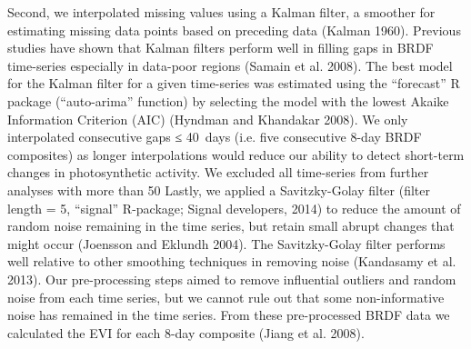 Second, we interpolated missing values using a Kalman filter, a smoother for estimating missing data points based on preceding data (Kalman 1960). Previous studies have shown that Kalman filters perform well in filling gaps in BRDF time-series especially in data-poor regions (Samain et al. 2008). The best model for the Kalman filter for a given time-series was estimated using the “forecast” R package (“auto-arima” function) by selecting the model with the lowest Akaike Information Criterion (AIC) (Hyndman and Khandakar 2008). We only interpolated consecutive gaps ≤ 40 days (i.e. five consecutive 8-day BRDF composites) as longer interpolations would reduce our ability to detect short-term changes in photosynthetic activity.  We excluded all time-series from further analyses with more than 50 %
Lastly, we applied a Savitzky-Golay filter (filter length = 5, “signal” R-package; Signal developers, 2014) to reduce the amount of random noise remaining in the time series, but retain small abrupt changes that might occur (Joensson and Eklundh 2004). The Savitzky-Golay filter performs well relative to other smoothing techniques in removing noise (Kandasamy et al. 2013). Our pre-processing steps aimed to remove influential outliers and random noise from each time series, but we cannot rule out that some non-informative noise has remained in the time series. From these pre-processed BRDF data we calculated the EVI for each 8-day composite (Jiang et al. 2008).

